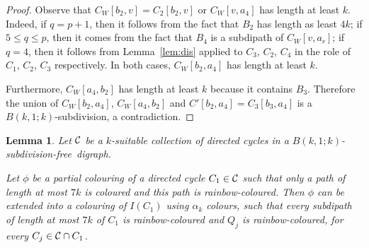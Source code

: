 \documentclass[utf8,10pt]{article}
\theoremstyle{plain}
\newtheorem{lemma}[theorem]{Lemma}
\theoremstyle{definition}
\theoremstyle{remark}
\newcommand{\free}{subdivision-free}
\begin{document}
\begin{proof}
Observe that $C_W[b_2,v]=C_2[b_2,v]$ or $C_W[v, a_4]$ has length at least $k$.
Indeed, if $q=p+1$, then it follows from the fact that $B_2$ has length as least $4k$; if
$5\leq q\leq p$, then it comes from the fact that $B_4$ is a subdipath of $C_W[v, a_r]$; if $q=4$, then it follows from Lemma~\ref{lem:dis}  applied to $C_3$, $C_2$, $C_4$ in the role of $C_1$, $C_2$, $C_3$ respectively.
In both cases, $C_W[b_2, a_4]$ has length at least $k$. 

Furthermore, $C_W[a_4,b_2]$ has length at least $k$ because it contains $B_3$. Therefore the union of
$C_W[b_2, a_4]$, $C_W[a_4,b_2]$ and $C'[b_2,a_4]=C_3[b_3,a_4]$ is a $B(k,1;k)$-subdivision, a contradiction.
\end{proof}




\begin{lemma}\label{lem:IC}
Let ${\cal C}$ be a $k$-suitable collection of directed cycles in a $B(k,1;k)$-\free\ digraph.

Let $\phi$ be a partial colouring of a directed cycle $C_1\in {\cal C}$ such that only a path of length at most
$7k$ is coloured and this path is rainbow-coloured. Then $\phi$ can be extended into
a colouring of $I(C_1)$ using $\alpha_k$ colours, such that every subdipath of length at most $7k$ of $C_1$ is rainbow-coloured and  $Q_j$ is rainbow-coloured, for every $C_j\in {\cal C}\cap C_1$.\end{lemma}
\end{document}
